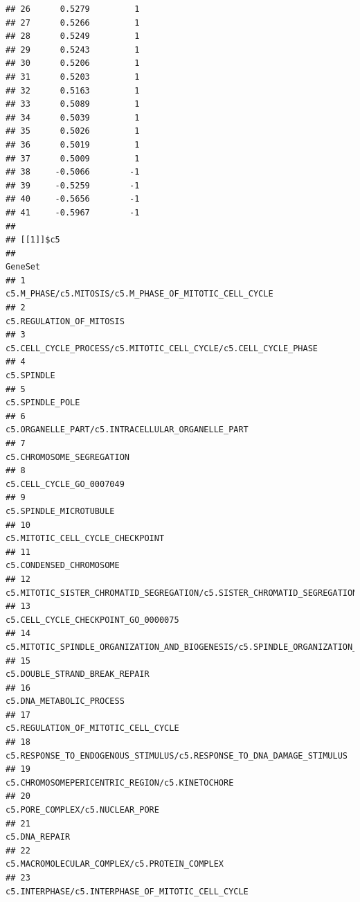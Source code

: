 \documentclass{article}\usepackage[]{graphicx}\usepackage[]{color}
\makeatletter
\newenvironment{kframe}{%
 \def\at@end@of@kframe{}%
 \ifinner\ifhmode%
  \def\at@end@of@kframe{\end{minipage}}%
  \begin{minipage}{\columnwidth}%
 \fi\fi%
 \def\FrameCommand##1{\hskip\@totalleftmargin \hskip-\fboxsep
 \colorbox{shadecolor}{##1}\hskip-\fboxsep
     \hskip-\linewidth \hskip-\@totalleftmargin \hskip\columnwidth}%
 \MakeFramed {\advance\hsize-\width
   \@totalleftmargin\z@ \linewidth\hsize
   \@setminipage}}%
 {\par\unskip\endMakeFramed%
 \at@end@of@kframe}
\newenvironment{knitrout}{}{} %
\makeatother
\begin{document}
\begin{knitrout}
\begin{kframe}
\begin{verbatim}
## 26      0.5279         1
## 27      0.5266         1
## 28      0.5249         1
## 29      0.5243         1
## 30      0.5206         1
## 31      0.5203         1
## 32      0.5163         1
## 33      0.5089         1
## 34      0.5039         1
## 35      0.5026         1
## 36      0.5019         1
## 37      0.5009         1
## 38     -0.5066        -1
## 39     -0.5259        -1
## 40     -0.5656        -1
## 41     -0.5967        -1
## 
## [[1]]$c5
##                                                                                  GeneSet
## 1                                 c5.M_PHASE/c5.MITOSIS/c5.M_PHASE_OF_MITOTIC_CELL_CYCLE
## 2                                                               c5.REGULATION_OF_MITOSIS
## 3                        c5.CELL_CYCLE_PROCESS/c5.MITOTIC_CELL_CYCLE/c5.CELL_CYCLE_PHASE
## 4                                                                             c5.SPINDLE
## 5                                                                        c5.SPINDLE_POLE
## 6                                      c5.ORGANELLE_PART/c5.INTRACELLULAR_ORGANELLE_PART
## 7                                                              c5.CHROMOSOME_SEGREGATION
## 8                                                               c5.CELL_CYCLE_GO_0007049
## 9                                                                 c5.SPINDLE_MICROTUBULE
## 10                                                      c5.MITOTIC_CELL_CYCLE_CHECKPOINT
## 11                                                               c5.CONDENSED_CHROMOSOME
## 12               c5.MITOTIC_SISTER_CHROMATID_SEGREGATION/c5.SISTER_CHROMATID_SEGREGATION
## 13                                                   c5.CELL_CYCLE_CHECKPOINT_GO_0000075
## 14 c5.MITOTIC_SPINDLE_ORGANIZATION_AND_BIOGENESIS/c5.SPINDLE_ORGANIZATION_AND_BIOGENESIS
## 15                                                         c5.DOUBLE_STRAND_BREAK_REPAIR
## 16                                                              c5.DNA_METABOLIC_PROCESS
## 17                                                   c5.REGULATION_OF_MITOTIC_CELL_CYCLE
## 18                 c5.RESPONSE_TO_ENDOGENOUS_STIMULUS/c5.RESPONSE_TO_DNA_DAMAGE_STIMULUS
## 19                                        c5.CHROMOSOMEPERICENTRIC_REGION/c5.KINETOCHORE
## 20                                                       c5.PORE_COMPLEX/c5.NUCLEAR_PORE
## 21                                                                         c5.DNA_REPAIR
## 22                                          c5.MACROMOLECULAR_COMPLEX/c5.PROTEIN_COMPLEX
## 23                                     c5.INTERPHASE/c5.INTERPHASE_OF_MITOTIC_CELL_CYCLE

\end{verbatim}
\end{kframe}
\end{knitrout}
\end{document}
